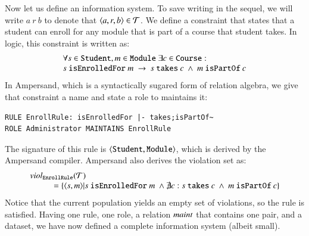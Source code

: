 \documentclass{elsarticle}
\begin{document}
	Now let us define an information system.
	To save writing in the sequel, we will write $a\ r\ b$ to denote that $\langle{a},{r},{b}\rangle\in\mathcal{T}$.
	We define a constraint that states that a student can enroll for any module that is part of a course that student takes.
	In logic, this constraint is written as:
\[\begin{array}{l}\forall s\in\text{\tt Student}, m\in\text{\tt Module}\ \exists c\in\text{\tt Course}:\\
s\ \text{\tt isEnrolledFor}\ m\ \rightarrow\ s\ \text{\tt takes}\ c\ \wedge\ m\ \text{\tt isPartOf}\ c
\end{array}\]
	In Ampersand, which is a syntactically sugared form of relation algebra,
	we give that constraint a name and state a role to maintains it:
\begin{verbatim}
RULE EnrollRule: isEnrolledFor |- takes;isPartOf~
ROLE Administrator MAINTAINS EnrollRule
\end{verbatim}
	The signature of this rule is $\langle{\text{\tt Student}},{\text{\tt Module}}\rangle$, which is derived by the Ampersand compiler.
	Ampersand also derives the violation set as:
\[\begin{array}{l}
	\viol{\triples}{\text{\tt EnrollRule}}\\
	\hspace{1cm}=\{\pair{s}{m}|s\ \text{\tt isEnrolledFor}\ m\ \wedge\not\exists c: s\ \text{\tt takes}\ c\ \wedge\ m\ \text{\tt isPartOf}\ c\}
\end{array}\]
	Notice that the current population yields an empty set of violations,
	so the rule is satisfied.
	Having one rule, one role, a relation $\text{\it maint\/}$ that contains one pair, and a dataset,
	we have now defined a complete information system (albeit small).
	
\end{document}
